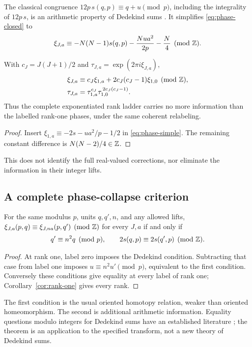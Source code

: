 The classical congruence
$12p\,s(q,p)\equiv q+u\pmod p$, including the integrality of $12p\,s$,
is an arithmetic property of Dedekind sums \cite[Ch.~3]{RademacherGrosswald1972}.
It simplifies \eqref{eq:phase-closed} to
\begin{equation}\label{eq:phase-simple}
 \xi_{J,a}\equiv-N(N-1)s(q,p)-\frac{Nu a^2}{2p}-\frac N4\pmod{\mathbb{Z}}.
\end{equation}
\begin{corollary}\label{cor:rank-one}
With $c_J=J(J+1)/2$ and $\tau_{J,a}=\exp(2\pi i\xi_{J,a})$,
\begin{align}
 \xi_{J,a}&\equiv c_J\xi_{1,a}+2c_J(c_J-1)\xi_{1,0}\pmod{\mathbb{Z}},\\
 \tau_{J,a}&=\tau_{1,a}^{c_J}\tau_{1,0}^{\,2c_J(c_J-1)}.
\end{align}
Thus the complete exponentiated rank ladder carries no more information
than the labelled rank-one phases, under the same coherent relabeling.
\end{corollary}
\begin{proof}
Insert $\xi_{1,a}\equiv-2s-u a^2/p-1/2$ in \eqref{eq:phase-simple}.
The remaining constant difference is $N(N-2)/4\in\mathbb{Z}$.
\end{proof}
This does not identify the full real-valued corrections, nor eliminate the
information in their integer lifts.

\subsection{A complete phase-collapse criterion}
\begin{theorem}\label{thm:phase-collapse}
For the same modulus $p$, units $q,q',n$, and any allowed lifts,
$\xi_{J,a}(p,q)\equiv\xi_{J,na}(p,q')\pmod{\mathbb{Z}}$ for every $J,a$ if and only if
\[
 q'\equiv n^2q\pmod p,\qquad
 2s(q,p)\equiv2s(q',p)\pmod{\mathbb{Z}}.
\]
\end{theorem}
\begin{proof}
At rank one, label zero imposes the Dedekind condition. Subtracting that
case from label one imposes $u\equiv n^2u'\pmod p$, equivalent to the
first condition. Conversely these conditions give equality at every label
of rank one; Corollary~\ref{cor:rank-one} gives every rank.
\end{proof}
The first condition is the usual oriented homotopy relation, weaker than
oriented homeomorphism.  The second is additional arithmetic information.
Equality questions modulo integers for Dedekind sums have an established
literature \cite{Tsukerman2014}; the theorem is an application to the
specified transform, not a new theory of Dedekind sums.


